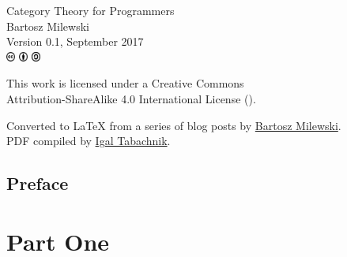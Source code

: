 \begin{small}
\begin{center}

\noindent
Category Theory for Programmers\\

\vspace{1.0em}
\noindent
Bartosz Milewski\\

\vspace{1.26em}
\noindent
Version 0.1, September 2017\\

\vspace{1.6em}
\noindent
\includegraphics[width=3mm]{fig/icons/cc.pdf}
\includegraphics[width=3mm]{fig/icons/by.pdf}
\includegraphics[width=3mm]{fig/icons/sa.pdf}

\vspace{0.4em}
\noindent
This work is licensed under a Creative Commons\\
Attribution-ShareAlike 4.0 International License 
(\href{http://creativecommons.org/licenses/by-sa/4.0/}{}).

\vspace{1.26em}
\noindent
Converted to LaTeX from a series of blog posts by \href{https://bartoszmilewski.com/2014/10/28/category-theory-for-programmers-the-preface/}{Bartosz Milewski}.\\
PDF compiled by \href{https://github.com/hmemcpy/milewski-ctfp-pdf}{Igal Tabachnik}.\\

\end{center}
\end{small}

\pagebreak
\tableofcontents

\chapter*{Preface}
\label{Preface}



\mainmatter

\part{Part One}

